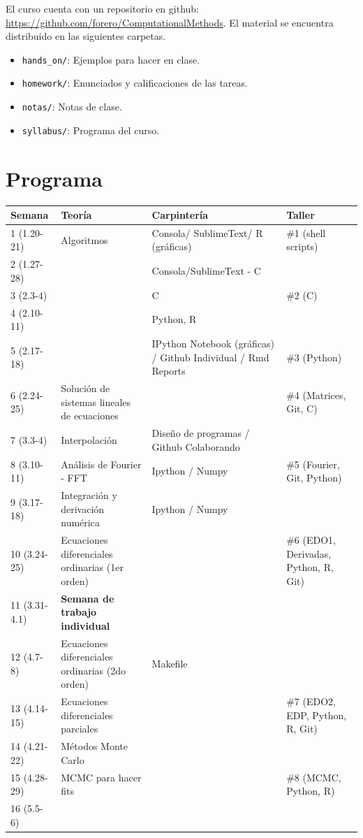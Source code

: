 \documentclass[11pt]{article}
\begin{document}
El curso cuenta con un repositorio en github:
\url{https://github.com/forero/ComputationalMethods}. El material se
encuentra distribuido en las siguientes carpetas. 


\begin{itemize}
\item \texttt{hands\_on/}: Ejemplos para hacer en clase.
\item \texttt{homework/}: Enunciados y calificaciones de las tareas.
\item \texttt{notas/}: Notas de clase.
\item \texttt{syllabus/}: Programa del curso.
\end{itemize}
 
 

\section*{Programa}

\begin{center}
\begin{tabular}{|p{2.1cm}|p{5.7cm}|p{4.0cm}|p{4.5cm}|}
\hline

Semana & Teor\'ia & Carpinter\'ia & Taller \\\hline
1 (1.20-21) & Algoritmos	& Consola/ SublimeText/ R (gr\'aficas) & \#1 (shell scripts)\\\hline
2 (1.27-28)& 	& Consola/SublimeText - C  & \\\hline
3 (2.3-4)& 	&C  & \#2 (C)\\\hline
4 (2.10-11)& 	&Python, R &  \\\hline
5 (2.17-18)& 	&IPython Notebook (gr\'aficas) / Github Individual / Rmd Reports & \#3
(Python) \\\hline
6 (2.24-25)&      Soluci\'on de sistemas lineales de ecuaciones &  & \#4
(Matrices, Git, C)\\\hline
7 (3.3-4)&  Interpolaci\'on & Dise\~no de programas / Github Colaborando & \\ \hline
8 (3.10-11)& An\'alisis de Fourier - FFT &  Ipython / Numpy& \#5 (Fourier, Git, Python)\\\hline
9 (3.17-18) & Integraci\'on y derivaci\'on num\'erica & Ipython / Numpy & \\\hline
10 (3.24-25) & Ecuaciones diferenciales ordinarias (1er orden)& &  \#6
(EDO1, Derivadas, Python, R, Git)\\\hline
11 (3.31-4.1) & {\bf Semana de trabajo individual} & &\\\hline
12 (4.7-8)& Ecuaciones diferenciales ordinarias (2do orden)&  Makefile &   \\\hline 
13 (4.14-15) & Ecuaciones diferenciales parciales & & \#7 (EDO2, EDP, Python, R, Git)\\\hline
14 (4.21-22) & M\'etodos Monte Carlo &   & \\\hline
15 (4.28-29) & MCMC para hacer fits &    & \#8 (MCMC, Python, R)\\\hline
16 (5.5-6) &  &    & \\\hline

\hline
\end{tabular}
\end{center}
\end{document}
